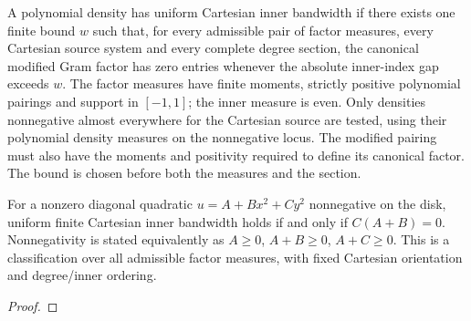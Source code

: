 \begin{definition}
\label{def:uniform-cartesian-inner-bandwidth}
\leanok
A polynomial density has uniform Cartesian inner bandwidth if there exists one finite bound $w$ such that, for every admissible pair of factor measures, every Cartesian source system and every complete degree section, the canonical modified Gram factor has zero entries whenever the absolute inner-index gap exceeds $w$. The factor measures have finite moments, strictly positive polynomial pairings and support in $[-1,1]$; the inner measure is even. Only densities nonnegative almost everywhere for the Cartesian source are tested, using their polynomial density measures on the nonnegative locus. The modified pairing must also have the moments and positivity required to define its canonical factor. The bound is chosen before both the measures and the section.
\end{definition}

\begin{theorem}
\label{thm:uniform-quadratic-classification}
\leanok
For a nonzero diagonal quadratic $u=A+Bx^2+Cy^2$ nonnegative on the disk, uniform finite Cartesian inner bandwidth holds if and only if $C(A+B)=0$. Nonnegativity is stated equivalently as $A\ge0$, $A+B\ge0$, $A+C\ge0$. This is a classification over all admissible factor measures, with fixed Cartesian orientation and degree/inner ordering.
\end{theorem}
\begin{proof}
\leanok
\end{proof}

